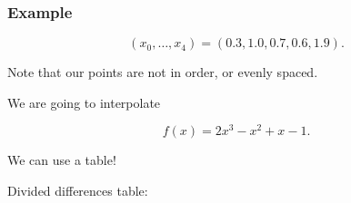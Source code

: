 \subsubsection{Example}

\[
  (x_0, \dots, x_4) = (0.3, 1.0, 0.7, 0.6, 1.9)
.\]

Note that our points are not in order, or evenly spaced.

We are going to interpolate 

\[
  f(x) = 2x^3 - x^2 +x - 1
.\]

We can use a table!

Divided differences table:


